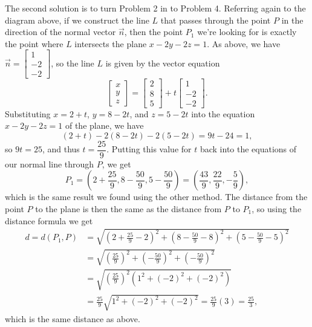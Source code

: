 \documentclass[12pt]{article}
\newcommand{\bbm}{\begin{bmatrix}}
\newcommand{\ebm}{\end{bmatrix}}
\begin{document}
\begin{enumerate}
The second solution is to turn Problem 2 in to Problem 4. Referring again to the diagram above, if we construct the line $L$ that passes through the point $P$ in the direction of the normal vector $\vec{n}$, then the point $P_1$ we're looking for is exactly the point where $L$ intersects the plane $x-2y-2z=1$. As above, we have $\vec{n} = \bbm 1\\-2\\-2\ebm$, so the line $L$ is given by the vector equation
\[
 \bbm x\\y\\z\ebm = \bbm 2\\8\\5\ebm + t\bbm 1\\-2\\-2\ebm.
\]
Substituting $x=2+t$, $y=8-2t$, and $z=5-2t$ into the equation $x-2y-2z=1$ of the plane, we have
\[
 (2+t)-2(8-2t)-2(5-2t) = 9t-24=1,
\]
so $9t=25$, and thus $t=\dfrac{25}{9}$. Putting this value for $t$ back into the equations of our normal line through $P$, we get
\[
 P_1 = \left(2+\frac{25}{9},8-\frac{50}{9}, 5-\frac{50}{9}\right) = \left(\frac{43}{9},\frac{22}{9},-\frac{5}{9}\right),
\]
which is the same result we found using the other method. The distance from the point $P$ to the plane is then the same as the distance from $P$ to $P_1$, so using the distance formula we get
\begin{align*}
 d = d(P_1,P) &= \sqrt{\left(2+\frac{25}{9}-2\right)^2+\left(8-\frac{50}{9} - 8\right)^2 + \left(5-\frac{50}{9}-5\right)^2}\\
& = \sqrt{\left(\frac{25}{9}\right)^2+\left(-\frac{50}{9}\right)^2 + \left(-\frac{50}{9}\right)^2}\\
& = \sqrt{\left(\frac{25}{9}\right)^2(1^2+(-2)^2+(-2)^2)}\\
& = \frac{25}{9}\sqrt{1^2+(-2)^2+(-2)^2} = \frac{25}{9}(3) = \frac{25}{3},
\end{align*}
which is the same distance as above.


 \end{enumerate}
\end{document}
